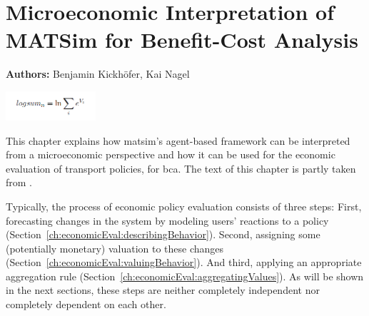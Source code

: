 \chapter{Microeconomic Interpretation of MATSim for Benefit-Cost Analysis}
\label{ch:economicEval}

\hfill \textbf{Authors:} Benjamin Kickhöfer, Kai Nagel

\begin{center} \includegraphics[width=0.25\textwidth, angle=0]{understanding/figures/logsum} \end{center}



This chapter explains how \acrshort{matsim}'s agent-based framework can be interpreted from a micro\-economic perspective and how it can be used for the economic evaluation of transport policies, \eg for \gls{bca}. The text of this chapter is partly taken from \citet[][Section~2.3]{Kickhoefer_PhDThesis_2014}.

Typically, the process of economic policy evaluation consists of three steps:
%
First, forecasting changes in the system by modeling users' reactions to a policy
(Section~\ref{ch:economicEval:describingBehavior}).
%
Second, assigning some (potentially monetary) valuation to these changes (Section~\ref{ch:economicEval:valuingBehavior}).
%
And third, applying an appropriate aggregation rule (Section~\ref{ch:economicEval:aggregatingValues}).
%
As will be shown in the next sections, these steps are neither completely independent nor completely dependent on each other.

